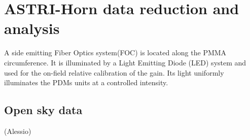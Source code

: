 \section{ASTRI-Horn data reduction and analysis} 
\label{sect:astridata}

A side emitting Fiber Optics system(FOC) is located  along the PMMA 
circumference. It is illuminated by a Light Emitting Diode (LED) 
system and used for the on-field relative calibration of the gain. 
Its light uniformly illuminates the PDMs units at a controlled intensity.


\subsection{Open sky data} (Alessio)
\label{subs:skydata}



